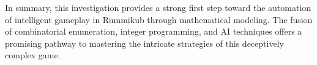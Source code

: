 \documentclass[11pt,letterpaper]{article}
\begin{document}
In summary, this investigation provides a strong first step toward the automation of intelligent gameplay in Rummikub through mathematical modeling. The fusion of combinatorial enumeration, integer programming, and AI techniques offers a promising pathway to mastering the intricate strategies of this deceptively complex game.

\bigskip



\end{document}
